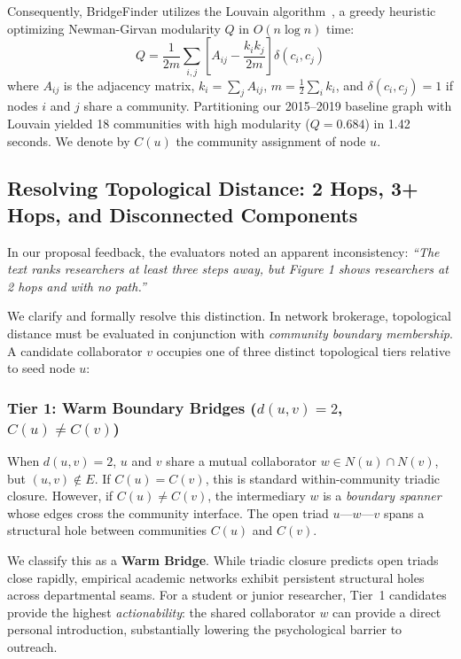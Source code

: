 Consequently, BridgeFinder utilizes the Louvain algorithm~\cite{blondel2008}, a greedy heuristic optimizing Newman-Girvan modularity $Q$ in $O(n \log n)$ time:
\begin{equation}
    Q = \frac{1}{2m} \sum_{i,j} \left[ A_{ij} - \frac{k_i k_j}{2m} \right] \delta(c_i, c_j)
\end{equation}
where $A_{ij}$ is the adjacency matrix, $k_i = \sum_j A_{ij}$, $m = \frac{1}{2}\sum_i k_i$, and $\delta(c_i, c_j) = 1$ if nodes $i$ and $j$ share a community. Partitioning our 2015--2019 baseline graph with Louvain yielded 18 communities with high modularity ($Q = 0.684$) in 1.42 seconds. We denote by $C(u)$ the community assignment of node $u$.

\subsection{Resolving Topological Distance: 2 Hops, 3+ Hops, and Disconnected Components}
\label{sec:distance_clarification}

In our proposal feedback, the evaluators noted an apparent inconsistency: \emph{``The text ranks researchers at least three steps away, but Figure 1 shows researchers at 2 hops and with no path.''} 

We clarify and formally resolve this distinction. In network brokerage, topological distance must be evaluated in conjunction with \emph{community boundary membership}. A candidate collaborator $v$ occupies one of three distinct topological tiers relative to seed node $u$:

\subsubsection{Tier 1: Warm Boundary Bridges ($d(u, v) = 2$, $C(u) \neq C(v)$)}
When $d(u, v) = 2$, $u$ and $v$ share a mutual collaborator $w \in N(u) \cap N(v)$, but $(u, v) \notin E$. If $C(u) = C(v)$, this is standard within-community triadic closure. However, if $C(u) \neq C(v)$, the intermediary $w$ is a \emph{boundary spanner} whose edges cross the community interface. The open triad $u \text{---} w \text{---} v$ spans a structural hole between communities $C(u)$ and $C(v)$. 

We classify this as a \textbf{Warm Bridge}. While triadic closure predicts open triads close rapidly, empirical academic networks exhibit persistent structural holes across departmental seams. For a student or junior researcher, Tier~1 candidates provide the highest \emph{actionability}: the shared collaborator $w$ can provide a direct personal introduction, substantially lowering the psychological barrier to outreach.

